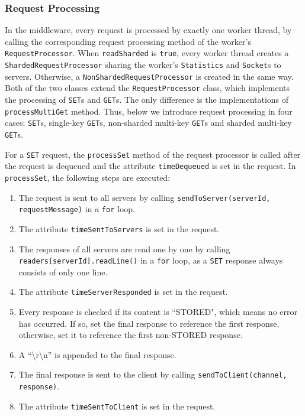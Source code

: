 \subsubsection{Request Processing} \label{request_processing}

In the middleware, every request is processed by exactly one worker thread, by calling the corresponding request processing method of the worker's \texttt{RequestProcessor}. When \texttt{readSharded} is \texttt{true}, every worker thread creates a \texttt{ShardedRequestProcessor} sharing the worker's \texttt{Statistics} and \texttt{Socket}s to servers. Otherwise, a \texttt{NonShardedRequestProcessor} is created in the same way. Both of the two classes extend the \texttt{RequestProcessor} class, which implements the processing of \texttt{SET}s and \texttt{GET}s. The only difference is the implementations of \texttt{processMultiGet} method. Thus, below we introduce request processing in four cases: \texttt{SET}s, single-key \texttt{GET}s, non-sharded multi-key \texttt{GET}s and sharded multi-key \texttt{GET}s.

For a \texttt{SET} request, the \texttt{processSet} method of the request processor is called after the request is dequeued and the attribute \texttt{timeDequeued} is set in the request. In \texttt{processSet}, the following steps are executed:

\begin{enumerate}[noitemsep,topsep=0pt]
\item The request is sent to all servers by calling \texttt{sendToServer(serverId, requestMessage)} in a \texttt{for} loop.
\item The attribute \texttt{timeSentToServers} is set in the request.
\item The responses of all servers are read one by one by calling \texttt{readers[serverId].readLine()} in a \texttt{for} loop, as a \texttt{SET} response always consists of only one line.
\item The attribute \texttt{timeServerResponded} is set in the request.
\item Every response is checked if its content is ``STORED", which means no error has occurred. If so, set the final response to reference the first response, otherwise, set it to reference the first non-STORED response.
\item A ``\textbackslash r\textbackslash n'' is appended to the final response.
\item The final response is sent to the client by calling \texttt{sendToClient(channel, response)}.
\item The attribute \texttt{timeSentToClient} is set in the request.
\end{enumerate}

